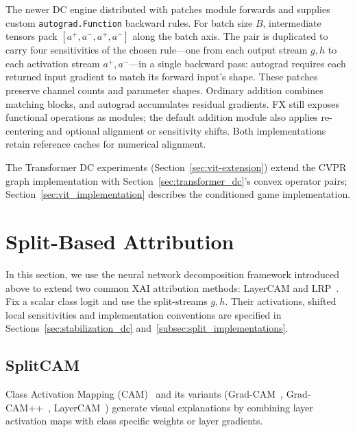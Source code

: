 The newer DC engine distributed with \textcite{playingBackward2026} patches module forwards and supplies custom \texttt{autograd.Function} backward rules. For batch size $B$, intermediate tensors pack $[a^+,a^-,a^+,a^-]$ along the batch axis. The pair is duplicated to carry four sensitivities of the chosen rule---one from each output stream $g,h$ to each activation stream $a^+,a^-$---in a single backward pass: autograd requires each returned input gradient to match its forward input's shape. These patches preserve channel counts and parameter shapes. Ordinary addition combines matching blocks, and autograd accumulates residual gradients. FX still exposes functional operations as modules; the default addition module also applies re-centering and optional alignment or sensitivity shifts. Both implementations retain reference caches for numerical alignment.

The Transformer DC experiments (Section~\ref{sec:vit-extension}) extend the CVPR graph implementation with Section~\ref{sec:transformer_dc}'s convex operator pairs; Section~\ref{sec:vit_implementation} describes the conditioned game implementation.

\section{Split-Based Attribution}\label{sec:split_attribution_concept}

In this section, we use the neural network decomposition framework introduced above to extend two common XAI attribution methods: LayerCAM and LRP~\parencite{hiddenMono}. Fix a scalar class logit and use the split-streams $g,h$. Their activations, shifted local sensitivities and implementation conventions are specified in Sections~\ref{sec:stabilization_dc} and~\ref{subsec:split_implementations}.

\subsection{SplitCAM}\label{sec:split_cam}

Class Activation Mapping (CAM)~\parencite{Zhou2016} and its variants (Grad-CAM~\parencite{Selvaraju2017}, Grad-CAM++~\parencite{Chattopadhay2018}, LayerCAM~\parencite{Jiang2021LayerCAM}) generate visual explanations by combining layer activation maps with class specific weights or layer gradients.

